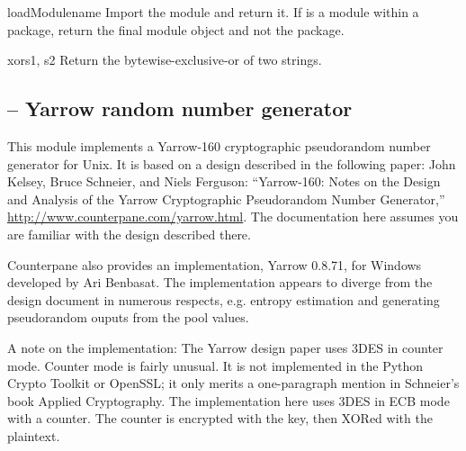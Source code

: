 \documentclass{howto}
\begin{document}
\begin{funcdesc}{loadModule}{name}
Import the module  and return it.  If  is a module
within a package, return the final module object and not the package.
\end{funcdesc}

\begin{funcdesc}{xor}{s1, s2}
Return the bytewise-exclusive-or of two strings.
\end{funcdesc}

\subsection{ 
	-- Yarrow random number generator}

This module implements a Yarrow-160 cryptographic pseudorandom number
generator for Unix.  It is based on a design described in the
following paper: John Kelsey, Bruce Schneier, and Niels Ferguson:
``Yarrow-160: Notes on the Design and Analysis of the Yarrow
Cryptographic Pseudorandom Number Generator,''
\url{http://www.counterpane.com/yarrow.html}.  The documentation here
assumes you are familiar with the design described there.

Counterpane also provides an implementation, Yarrow 0.8.71, for
Windows developed by Ari Benbasat.  The implementation appears to
diverge from the design document in numerous respects, e.g. entropy
estimation and generating pseudorandom ouputs from the pool values.

A note on the implementation: The Yarrow design paper uses 3DES in
counter mode.  Counter mode is fairly unusual.  It is not implemented
in the Python Crypto Toolkit or OpenSSL; it only merits a
one-paragraph mention in Schneier's book Applied Cryptography.  The
implementation here uses 3DES in ECB mode with a counter.  The counter
is encrypted with the key, then XORed with the plaintext.
\end{document}
